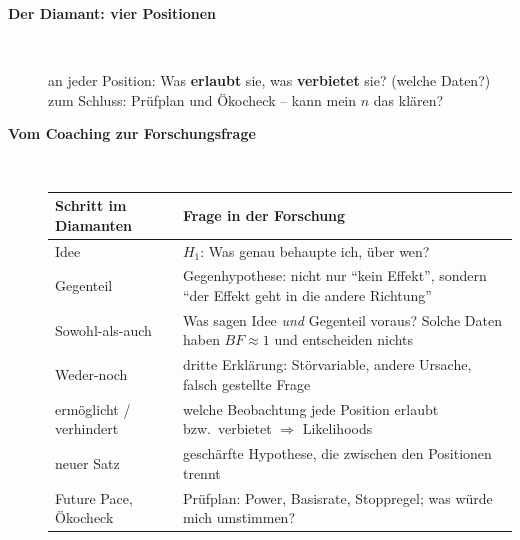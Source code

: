\begin{description}
\item[{\rot\bf Der Diamant: vier Positionen}]~\\[-\lblskip]
\begin{center}
\end{center}
\bi
  \ite an jeder Position: Was \textbf{erlaubt} sie, was \textbf{verbietet}
    sie? (welche Daten?)
  \ite zum Schluss: Prüfplan und Ökocheck -- kann mein $n$ das klären?
\ei
\os{\newpage}

\item[{\rot\bf Vom Coaching zur Forschungsfrage}]~\\[-\lblskip]
\begin{center}
\small
\begin{tabular}{@{}p{}p{}@{}}
\toprule
\textbf{Schritt im Diamanten} & \textbf{Frage in der Forschung} \\
\midrule
Idee & $H_1$: Was genau behaupte ich, über wen? \\
Gegenteil & Gegenhypothese: nicht nur \enquote{kein Effekt}, sondern
  \enquote{der Effekt geht in die andere Richtung} \\
Sowohl-als-auch & Was sagen Idee \emph{und} Gegenteil voraus? Solche
  Daten haben $\mathit{BF}\approx1$ und entscheiden nichts \\
Weder-noch & dritte Erklärung: Störvariable, andere Ursache, falsch
  gestellte Frage \\
ermöglicht / verhindert & welche Beobachtung jede Position erlaubt bzw.\
  verbietet $\Rightarrow$ Likelihoods \\
neuer Satz & geschärfte Hypothese, die zwischen den Positionen trennt \\
Future Pace, Ökocheck & Prüfplan: Power, Basisrate, Stoppregel; was
  würde mich umstimmen? \\
\bottomrule
\end{tabular}
\end{center}
\os{\newpage}


\end{description}
